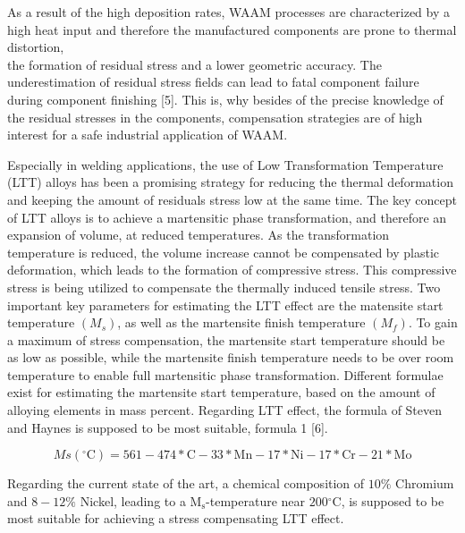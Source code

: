 \documentclass[10pt]{article}
\begin{document}
As a result of the high deposition rates, WAAM processes are characterized by a high heat input and therefore the manufactured components are prone to thermal distortion,\\
the formation of residual stress and a lower geometric accuracy. The underestimation of residual stress fields can lead to fatal component failure during component finishing [5]. This is, why besides of the precise knowledge of the residual stresses in the components, compensation strategies are of high interest for a safe industrial application of WAAM.

Especially in welding applications, the use of Low Transformation Temperature (LTT) alloys has been a promising strategy for reducing the thermal deformation and keeping the amount of residuals stress low at the same time. The key concept of LTT alloys is to achieve a martensitic phase transformation, and therefore an expansion of volume, at reduced temperatures. As the transformation temperature is reduced, the volume increase cannot be compensated by plastic deformation, which leads to the formation of compressive stress. This compressive stress is being utilized to compensate the thermally induced tensile stress. Two important key parameters for estimating the LTT effect are the matensite start temperature $\left(M_{s}\right)$, as well as the martensite finish temperature $\left(M_{f}\right)$. To gain a maximum of stress compensation, the martensite start temperature should be as low as possible, while the martensite finish temperature needs to be over room temperature to enable full martensitic phase transformation. Different formulae exist for estimating the martensite start temperature, based on the amount of alloying elements in mass percent. Regarding LTT effect, the formula of Steven and Haynes is supposed to be most suitable, formula 1 [6].


\begin{equation*}
M s\left({ }^{\circ} \mathrm{C}\right)=561-474 * \mathrm{C}-33 * \mathrm{Mn}-17 * \mathrm{Ni}-17 * \mathrm{Cr}-21 * \mathrm{Mo} \tag{1}
\end{equation*}


Regarding the current state of the art, a chemical composition of $10 \%$ Chromium and $8-12 \%$ Nickel, leading to a $\mathrm{M}_{\mathrm{s}}$-temperature near $200{ }^{\circ} \mathrm{C}$, is supposed to be most suitable for achieving a stress compensating LTT effect.
\end{document}
